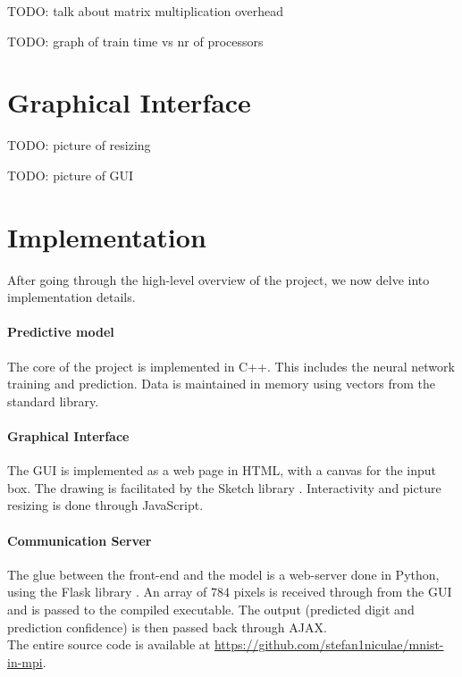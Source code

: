 \documentclass[a4paper]{article}
\begin{document}
TODO: talk about matrix multiplication overhead

TODO: graph of train time vs nr of processors



\newpage
\section{Graphical Interface}
TODO: picture of resizing

TODO: picture of GUI



\newpage
\section{Implementation}
After going through the high-level overview of the project, we now delve into implementation details.

\paragraph{Predictive model} The core of the project is implemented in C++. This includes the neural network training and prediction. Data is maintained in memory using vectors from the standard library.

\paragraph{Graphical Interface} The GUI is implemented as a web page in HTML, with a canvas for the input box.
The drawing is facilitated by the Sketch library \cite{sketch}. Interactivity and picture resizing is done through JavaScript.

\paragraph{Communication Server} The glue between the front-end and the model is a web-server done in Python, using the Flask library \cite{flask}. An array of $784$ pixels is received through from the GUI and is passed to the compiled executable. The output (predicted digit and prediction confidence) is then passed back through AJAX.
\\

The entire source code is available at \url{https://github.com/stefan1niculae/mnist-in-mpi}.

\vspace{\fill} %

    
    
\end{document}
